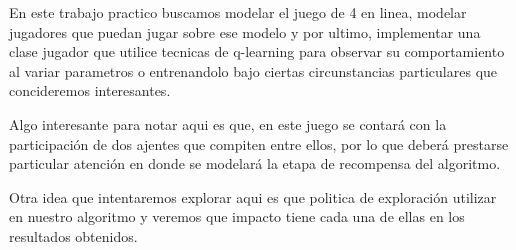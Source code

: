 En este trabajo practico buscamos modelar el juego de 4 en linea, modelar jugadores que puedan jugar sobre ese modelo y por ultimo, implementar una clase jugador que utilice tecnicas de q-learning para observar su comportamiento al variar parametros o entrenandolo bajo ciertas circunstancias particulares que concideremos interesantes.

Algo interesante para notar aqui es que, en este juego se contará con la participación de dos ajentes que compiten entre ellos, por lo que deberá prestarse particular atención en donde se modelará la etapa de recompensa del algoritmo. \completar

Otra idea que intentaremos explorar aqui es que politica de exploración utilizar en nuestro algoritmo y veremos que impacto tiene cada una de ellas en los resultados obtenidos.